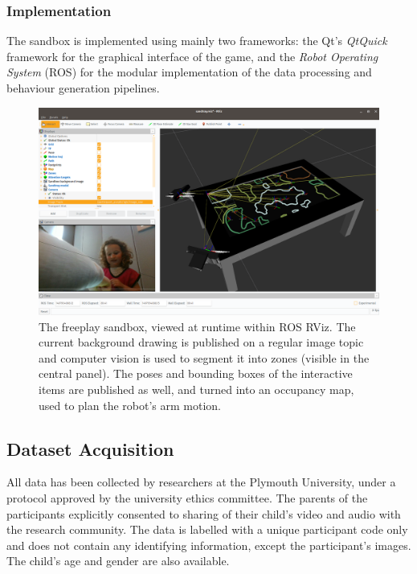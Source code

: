 \documentclass{article}
\begin{document}
\subsubsection{Implementation}

The sandbox is implemented using mainly two frameworks: the Qt's \emph{QtQuick} framework
for the graphical interface of the game, and the \emph{Robot Operating System}
(ROS) for the modular implementation of the data processing and behaviour
generation pipelines.

\begin{figure}
    \centering
    \includegraphics[width=0.9\linewidth]{rviz-sandtray}
    \caption{The freeplay sandbox, viewed at runtime within ROS RViz. The
    current background drawing is published on a regular image
    topic and computer vision is used to segment it into zones (visible in
    the central panel). The poses and bounding boxes of the interactive items
    are published as well, and turned into an occupancy map, used to plan the
    robot's arm motion.}
    \label{fig|rviz}
\end{figure}

\subsection{Dataset Acquisition}

All data has been collected by researchers at the Plymouth University, under a
protocol approved by the university ethics committee. The parents of the
participants explicitly consented to sharing of their child's video and audio
with the research community. The data is labelled with a unique participant code
only and does not contain any identifying information, except the participant's
images. The child's age and gender are also available.
\end{document}
